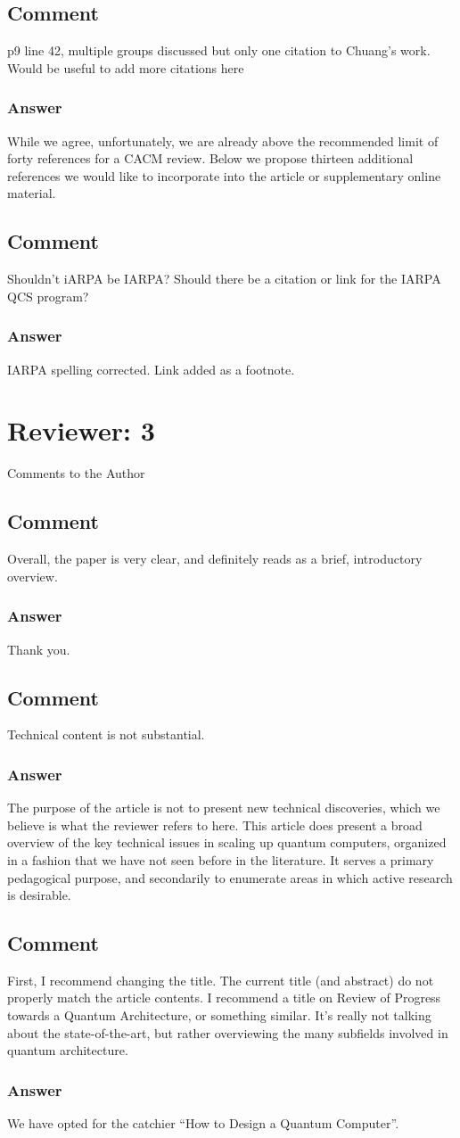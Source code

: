 \documentclass{article}
\newcommand{\comment}{\subsection{Comment}\em}
\newcommand{\answer}{\rm \subsubsection*{Answer}}
\begin{document}
\comment

p9 line 42, multiple groups discussed but only one citation to Chuang's work.
Would be useful to add more citations here

\answer

While we agree, unfortunately, we are already above the recommended
limit of forty references for a CACM review.  Below we propose
thirteen additional references we would like to incorporate into the
article or supplementary online material.

\comment

Shouldn't iARPA be IARPA?  Should there be a citation or link
for the IARPA QCS program?

\answer

IARPA spelling corrected.  Link added as a footnote.

\section{Reviewer: 3}

Comments to the Author

\comment

Overall, the paper is very clear, and definitely reads as a brief,
introductory overview.

\answer

Thank you.

\comment

Technical content is not substantial.

\answer

The purpose of the article is not to present new technical
discoveries, which we believe is what the reviewer refers to here.
This article does present a broad overview of the key technical issues
in scaling up quantum computers, organized in a fashion that we have
not seen before in the literature.  It serves a primary pedagogical
purpose, and secondarily to enumerate areas in which active research
is desirable.

\comment

First, I recommend changing the title.  The current title (and
abstract) do not properly match the article contents.  I recommend a
title on Review of Progress towards a Quantum Architecture, or
something similar. It's really not talking about the state-of-the-art,
but rather overviewing the many subfields involved in quantum
architecture.

\answer

We have opted for the catchier ``How to Design a Quantum Computer''.
\end{document}
